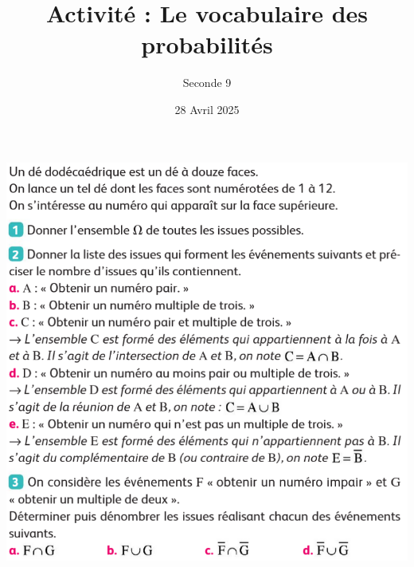 \documentclass{article}
\title{Activité : Le vocabulaire des probabilités}
\date{28 Avril 2025}
\author{Seconde 9}
\begin{document}
\maketitle
\begin{center}
\includegraphics[width=\textwidth]{Activite_vocabulaire_probabilites.png}
\end{center}
\end{document}
